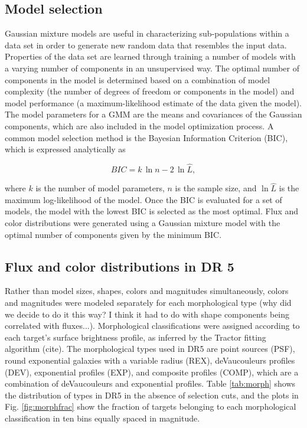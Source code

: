 \subsection{Model selection}

Gaussian mixture models are useful in characterizing sub-populations within a data set in order to generate new random data that resembles the input data. Properties of the data set are learned through training a number of models with a varying number of components in an unsupervised way. The optimal number of components in the model is determined based on a combination of model complexity (the number of degrees of freedom or components in the model) and model performance (a maximum-likelihood estimate of the data given the model). The model parameters for a GMM are the means and covariances of the Gaussian components, which are also included in the model optimization process. A common model selection method is the Bayesian Information Criterion (BIC), which is expressed analytically as

\begin{equation}
    BIC = k\,\ln{n} - 2\,\ln\hat{L},
\end{equation}

where $k$ is the number of model parameters, $n$ is the sample size, and $\ln\hat{L}$ is the maximum log-likelihood of the model. Once the BIC is evaluated for a set of models, the model with the lowest BIC is selected as the most optimal. Flux and color distributions were generated using a Gaussian mixture model with the optimal number of components given by the minimum BIC. 

\subsection{Flux and color distributions in DR 5}

 Rather than model sizes, shapes, colors and magnitudes simultaneously, colors and magnitudes were modeled separately for each morphological type (why did we decide to do it this way? I think it had to do with shape components being correlated with fluxes...). Morphological classifications were assigned according to each target's surface brightness profile, as inferred by the Tractor fitting algorithm (cite). The morphological types used in DR5 are point sources (PSF), round exponential galaxies with a variable radius (REX), deVaucouleurs profiles (DEV), exponential profiles (EXP), and composite profiles (COMP), which are a combination of deVaucouleurs and exponential profiles. Table \ref{tab:morph} shows the distribution of types in DR5 in the absence of selection cuts, and the plots in Fig. \ref{fig:morphfrac} show the fraction of targets belonging to each morphological classification in ten bins equally spaced in magnitude.

